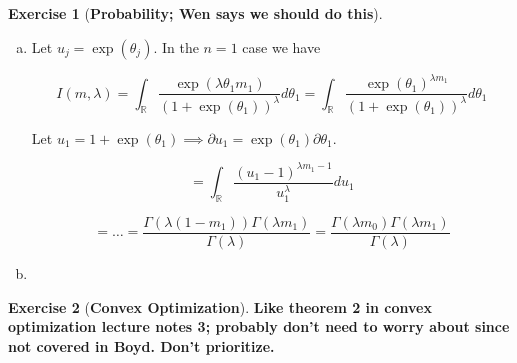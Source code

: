 \documentclass{article}
\theoremstyle{definition}
\newtheorem{exercise}{Exercise}
\theoremstyle{definition}
\theoremstyle{definition}
\theoremstyle{definition}
\begin{document}
\begin{exercise}[\textbf{Probability; Wen says we should do this}]

\begin{enumerate}[(a)]

\item Let \(u_j = \exp(\theta_j)\). In the \(n=1\) case we have

\[
I(m, \lambda) = \int_{\mathbb{R}} \frac{ \exp(\lambda \theta_1m_1) }{(1 + \exp(\theta_1) ) ^{\lambda}} d \theta_1 = \int_{\mathbb{R}} \frac{ \exp( \theta_1)^{\lambda m_1} }{(1 + \exp(\theta_1) ) ^{\lambda}} d \theta_1
\]

Let \(u_1 = 1 + \exp(\theta_1) \implies \partial u_1 = \exp(\theta_1)  \partial \theta_1\).

\[
= \int_{\mathbb{R}} \frac{ (u_1 - 1)^{\lambda m_1 - 1} }{u_1^{\lambda}} d u_1
\]

\[
= \ldots = \frac{\Gamma(\lambda (1 - m_1)) \Gamma(\lambda m_1)}{\Gamma(\lambda)}  = \frac{\Gamma(\lambda m_0) \Gamma(\lambda m_1)}{\Gamma(\lambda)}
\]

\item

\end{enumerate}

\end{exercise}

\begin{exercise}[\textbf{Convex Optimization}]

\textbf{Like theorem 2 in convex optimization lecture notes 3; probably don't need to worry about since not covered in Boyd. Don't prioritize.}

\end{exercise}
\end{document}
